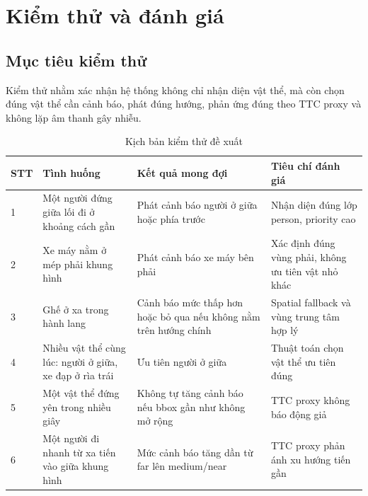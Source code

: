 \documentclass[twoside,final]{hcmut-report}
\begin{document}
\section{Kiểm thử và đánh giá}

\subsection{Mục tiêu kiểm thử}
Kiểm thử nhằm xác nhận hệ thống không chỉ nhận diện vật thể, mà còn chọn đúng vật thể cần cảnh báo, phát đúng hướng, phản ứng đúng theo TTC proxy và không lặp âm thanh gây nhiễu.

\begin{table}[H]
  \centering
  \caption{Kịch bản kiểm thử đề xuất}
  \label{tab:test-scenarios}
  \begin{tabularx}{\textwidth}{L{1.1cm}Y Y Y}
    \toprule
    \textbf{STT} & \textbf{Tình huống} & \textbf{Kết quả mong đợi} & \textbf{Tiêu chí đánh giá} \\
     & Một người đứng giữa lối đi ở khoảng cách gần & Phát cảnh báo người ở giữa hoặc phía trước & Nhận diện đúng lớp person, priority cao \\
    2 & Xe máy nằm ở mép phải khung hình & Phát cảnh báo xe máy bên phải & Xác định đúng vùng phải, không ưu tiên vật nhỏ khác \\
    3 & Ghế ở xa trong hành lang & Cảnh báo mức thấp hơn hoặc bỏ qua nếu không nằm trên hướng chính & Spatial fallback và vùng trung tâm hợp lý \\
    4 & Nhiều vật thể cùng lúc: người ở giữa, xe đạp ở rìa trái & Ưu tiên người ở giữa & Thuật toán chọn vật thể ưu tiên đúng \\
    5 & Một vật thể đứng yên trong nhiều giây & Không tự tăng cảnh báo nếu bbox gần như không mở rộng & TTC proxy không báo động giả \\
    6 & Một người đi nhanh từ xa tiến vào giữa khung hình & Mức cảnh báo tăng dần từ far lên medium/near & TTC proxy phản ánh xu hướng tiến gần \\
    \bottomrule
  \end{tabularx}
\end{table}
\end{document}

